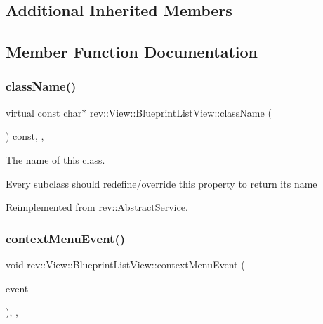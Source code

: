 \subsection*{Additional Inherited Members}


\subsection{Member Function Documentation}
\mbox{\label{classrev_1_1_view_1_1_blueprint_list_view_ab64a820b0e1fff62711f536fc89bf832}} 
\subsubsection{\texorpdfstring{className()}{className()}}
{\footnotesize\ttfamily virtual const char$\ast$ rev\+::\+View\+::\+Blueprint\+List\+View\+::class\+Name (\begin{DoxyParamCaption}{ }\end{DoxyParamCaption}) const\hspace{0.3cm}{\ttfamily [inline]}, {\ttfamily [override]}, {\ttfamily [virtual]}}



The name of this class. 

Every subclass should redefine/override this property to return its name 

Reimplemented from \mbox{\hyperlink{classrev_1_1_abstract_service_a0b64ee4651db7637a70265697ca62453}{rev\+::\+Abstract\+Service}}.

\mbox{\label{classrev_1_1_view_1_1_blueprint_list_view_add611c892518e8bab79ec2a8f4cd3896}} 
\subsubsection{\texorpdfstring{contextMenuEvent()}{contextMenuEvent()}}
{\footnotesize\ttfamily void rev\+::\+View\+::\+Blueprint\+List\+View\+::context\+Menu\+Event (\begin{DoxyParamCaption}\item[{Q\+Context\+Menu\+Event $\ast$}]{event }\end{DoxyParamCaption})\hspace{0.3cm}{\ttfamily [override]}, {\ttfamily [protected]}, {\ttfamily [virtual]}}



